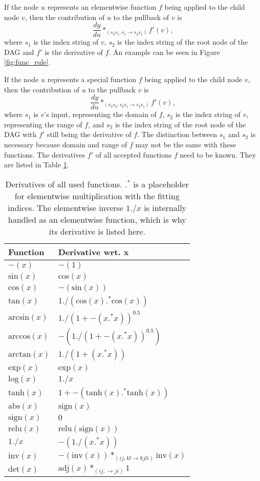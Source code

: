 \documentclass[12pt, a4paper]{report}
\begin{document}
If the node $u$ represents an elementwise function $f$ being applied to the child node $v$, then the contribution of $u$ to the pullback of $v$ is 
$$
\frac{dy}{du} *_{(s_2s_1,s_1 \rightarrow s_2s_1)} f'(v),
$$
where $s_1$ is the index string of $v$, $s_2$ is the index string of the root node of the DAG and $f'$ is the derivative of $f$.
An example can be seen in Figure \ref{fig:func_rule}.

If the node $u$ represents a special function $f$ being applied to the child node $v$, then the contribution of $u$ to the pullback $v$ is
$$
\frac{dy}{du} *_{(s_3s_2,s_2s_1 \rightarrow s_3s_1)} f'(v),
$$
where $s_1$ is $v$'s input, representing the domain of $f$, $s_2$ is the index string of $v$, representing the range of $f$, and $s_3$ is the index string of the root node of the DAG with $f'$ still being the derivative of $f$.
The distinction between $s_1$ and $s_2$ is necessary because domain and range of $f$ may not be the same with these functions.
The derivatives $f'$ of all accepted functions $f$ need to be known.
They are listed in Table \ref{tab:func_diffs}.

\begin{table}[ht]
    \centering
    \begin{tabular}{l | l}
        Function & Derivative wrt. x \\\hline
        $-(x)$ & $-(1)$ \\
        $\text{sin}(x)$ & $\text{cos}(x)$ \\
        $\text{cos}(x)$ & $-(\text{sin}(x))$ \\
        $\text{tan}(x)$ & $1 ./ (\text{cos}(x) .^* \text{cos}(x))$ \\
        $\text{arcsin}(x)$ & $1 ./ (1 + -(x .^* x))^{0.5}$ \\
        $\text{arccos}(x)$ & $-(1 ./ (1 + -(x .^* x))^{0.5})$ \\
        $\text{arctan}(x)$ & $1 ./ (1 + (x .^* x))$ \\
        $\text{exp}(x)$ & $\text{exp}(x)$ \\
        $\text{log}(x)$ & $1 ./ x$ \\
        $\text{tanh}(x)$ & $1 + -(\text{tanh}(x) .^* \text{tanh}(x))$ \\
        $\text{abs}(x)$ & $\text{sign}(x)$ \\
        $\text{sign}(x)$ & $0$ \\
        $\text{relu}(x)$ & $\text{relu}(\text{sign}(x))$ \\
        $1 ./ x$ & $- (1 ./ (x .^* x))$ \\
        $\text{inv}(x)$ & $-(\text{inv}(x)) *_{(ij,kl \rightarrow kjli)} \text{inv}(x)$ \\
        $\text{det}(x)$ & $\text{adj}(x) *_{(ij, \rightarrow ji)} 1$ \\
    \end{tabular}
    \caption[List of All Function Derivatives Used in Differentiation]{Derivatives of all used functions. $.^*$ is a placeholder for elementwise multiplication with the fitting indices. The elementwise inverse $1 ./ x$ is internally handled as an elementwise function, which is why its derivative is listed here.}
    \label{tab:func_diffs}
\end{table}
\end{document}
